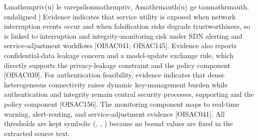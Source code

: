 {}\markdownRendererAmpersand{} L\markdownRendererUnderscore{}\markdownRendererLeftBrace{}\markdownRendererBackslash{}mathrm\markdownRendererLeftBrace{}priv\markdownRendererRightBrace{}\markdownRendererRightBrace{}(u) \markdownRendererBackslash{}le \markdownRendererBackslash{}varepsilon\markdownRendererUnderscore{}\markdownRendererLeftBrace{}\markdownRendererBackslash{}mathrm\markdownRendererLeftBrace{}priv\markdownRendererRightBrace{}\markdownRendererRightBrace{}, \markdownRendererBackslash{}\markdownRendererSoftLineBreak
{}\markdownRendererAmpersand{} A\markdownRendererUnderscore{}\markdownRendererLeftBrace{}\markdownRendererBackslash{}mathrm\markdownRendererLeftBrace{}auth\markdownRendererRightBrace{}\markdownRendererRightBrace{}(u) \markdownRendererBackslash{}ge \markdownRendererBackslash{}tau\markdownRendererUnderscore{}\markdownRendererLeftBrace{}\markdownRendererBackslash{}mathrm\markdownRendererLeftBrace{}auth\markdownRendererRightBrace{}\markdownRendererRightBrace{}.\markdownRendererSoftLineBreak
{}\markdownRendererBackslash{}end\markdownRendererLeftBrace{}aligned\markdownRendererRightBrace{}\markdownRendererSoftLineBreak
{}]\markdownRendererParagraphSeparator
{}Evidence indicates that service utility is exposed when network interruption events occur and when falsification risks degrade trustworthiness, so  is linked to interruption and integrity-monitoring risk under SDN alerting and service-adjustment workflows [O\markdownRendererUnderscore{}ISAC\markdownRendererUnderscore{}041; O\markdownRendererUnderscore{}ISAC\markdownRendererUnderscore{}145]. Evidence also reports confidential-data leakage concern and a model-update exchange rule, which directly supports the privacy-leakage constraint  and the  policy component [O\markdownRendererUnderscore{}ISAC\markdownRendererUnderscore{}039]. For authentication feasibility, evidence indicates that dense heterogeneous connectivity raises dynamic key-management burden while authentication and integrity remain central security processes, supporting  and the  policy component [O\markdownRendererUnderscore{}ISAC\markdownRendererUnderscore{}156]. The monitoring component  maps to real-time warning, alert-routing, and service-adjustment evidence [O\markdownRendererUnderscore{}ISAC\markdownRendererUnderscore{}041]. All thresholds are kept symbolic (, , ) because no bound values are fixed in the extracted source text.\markdownRendererInterblockSeparator
